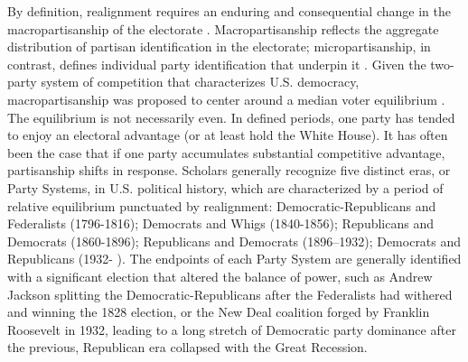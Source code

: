 By definition, realignment requires an enduring and consequential change in the macropartisanship of the electorate \citep{meffert_realignment_2001}. Macropartisanship reflects the aggregate distribution of partisan identification in the electorate; micropartisanship, in contrast, defines individual party identification that underpin it \citep{andersen_after_1996}. Given the two-party system of competition that characterizes U.S. democracy, macropartisanship was proposed to center around a median voter equilibrium \citep{downs_economic_1957}. The equilibrium is not necessarily even. In defined periods, one party has tended to enjoy an electoral advantage (or at least hold the White House). It has often been the case that if one party accumulates substantial competitive advantage, partisanship shifts in response. Scholars generally recognize five distinct eras, or Party Systems, in U.S. political history, which are characterized by a period of relative equilibrium punctuated by realignment: Democratic-Republicans and Federalists (1796-1816); Democrats and Whigs (1840-1856); Republicans and Democrats (1860-1896); Republicans and Democrats (1896–1932); Democrats and Republicans (1932- ). The endpoints of each Party System are generally identified with a significant election that altered the balance of power, such as Andrew Jackson splitting the Democratic-Republicans after the Federalists had withered and winning the 1828 election, or the New Deal coalition forged by Franklin Roosevelt in 1932, leading to a long stretch of Democratic party dominance after the previous, Republican era collapsed with the Great Recession. 

